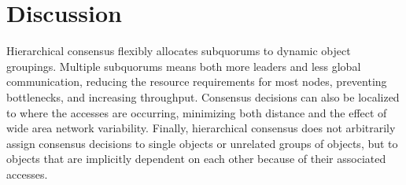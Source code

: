 \documentclass[sigconf]{acmart}
\begin{document}
\section{Discussion}

Hierarchical consensus flexibly allocates subquorums to dynamic object groupings.
Multiple subquorums means both more leaders and less global communication, reducing the
resource requirements for most nodes, preventing bottlenecks, and increasing throughput.
Consensus decisions can also be localized to where the accesses are occurring,
minimizing both distance and the effect of wide area network variability.
Finally, hierarchical consensus does not arbitrarily assign consensus decisions to single
objects or unrelated groups of objects, but to objects that are implicitly dependent on
each other because of their associated accesses.




\end{document}
